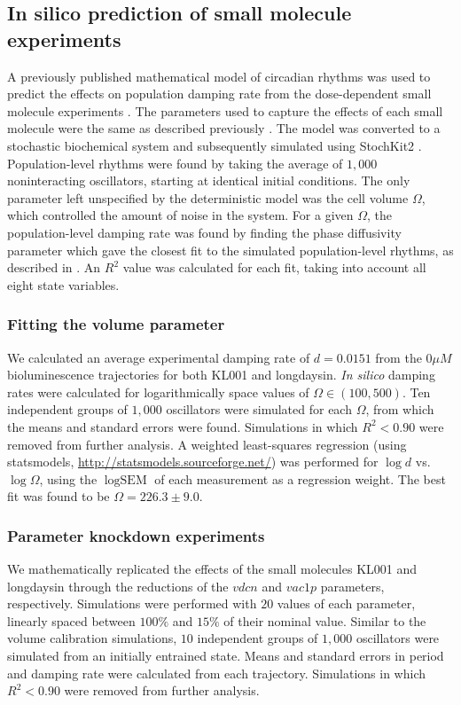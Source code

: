 \documentclass[11pt, letterpaper]{article}
\begin{document}
\subsection*{{In silico} prediction of small molecule experiments}
A previously published mathematical model of circadian rhythms was used to predict the effects on population damping rate from the dose-dependent small molecule experiments \cite{Hirota2012}.
The parameters used to capture the effects of each small molecule were the same as described previously \cite{St.John2014}.
The model was converted to a stochastic biochemical system and subsequently simulated using StochKit2 \cite{Sanft2011a}.
Population-level rhythms were found by taking the average of $1,000$ noninteracting oscillators, starting at identical initial conditions.
The only parameter left unspecified by the deterministic model was the cell volume $\Omega$, which controlled the amount of noise in the system.
For a given $\Omega$, the population-level damping rate was found by finding the phase diffusivity parameter which gave the closest fit to the simulated population-level rhythms, as described in \cite{St.John2014a}.
An $R^2$ value was calculated for each fit, taking into account all eight state variables.

\subsubsection*{Fitting the volume parameter}
We calculated an average experimental damping rate of $d = 0.0151$ from the $0 \mu M$ bioluminescence trajectories for both KL001 and longdaysin.
{\itshape In silico} damping rates were calculated for logarithmically space values of $\Omega \in (100, 500)$.
Ten independent groups of $1,000$ oscillators were simulated for each $\Omega$, from which the means and standard errors were found.
Simulations in which $R^2 < 0.90$ were removed from further analysis.
A weighted least-squares regression (using statsmodels, \url{http://statsmodels.sourceforge.net/}) was performed for $\log d$ vs.\ $\log \Omega$, using the $\log \text{SEM}$ of each measurement as a regression weight.
The best fit was found to be $\Omega = 226.3 \pm 9.0$.

\subsubsection*{Parameter knockdown experiments}
We mathematically replicated the effects of the small molecules KL001 and longdaysin through the reductions of the $vdcn$ and $vac1p$ parameters, respectively.
Simulations were performed with $20$ values of each parameter, linearly spaced between $100\%$ and $15\%$ of their nominal value.
Similar to the volume calibration simulations, $10$ independent groups of $1,000$ oscillators were simulated from an initially entrained state.
Means and standard errors in period and damping rate were calculated from each trajectory.
Simulations in which $R^2 < 0.90$ were removed from further analysis.
\end{document}
